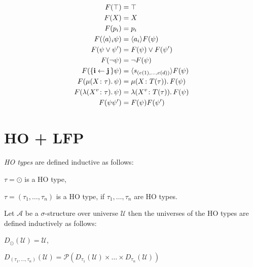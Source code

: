 \begin{frame}
\begin{definition}
\begin{align*}
F(\top) &= \top\\
F(X) &= X\\
F(p_i) &= p_i\\
F(\langle a \rangle_i \psi) &= \langle a_i \rangle F(\psi) \\
F(\psi \vee \psi') &= F(\psi) \vee F(\psi') \\
F(\neg \psi) &= \neg F(\psi) \\
F(\{\emph{i} \leftarrow \emph{j}\,\} \psi) &= \langle s_{(e(1), \dots, e(d))} \rangle F(\psi)  \\
F(\mu (X \colon \tau).\,\psi) &= \mu (X \colon T(\tau)).\,F(\psi) \\
F(\lambda (X^v \colon \tau).\, \psi) &= \lambda (X^v \colon T(\tau)).\, F(\psi) \\
F(\psi{\psi'}) &= F(\psi)F({\psi'})
\end{align*}

\end{definition}
\end{frame}

\section{HO + LFP}

\begin{frame}

\begin{definition}
\emph{HO types} are defined inductive as follows:
\begin{compactitem}
\item $\tau = \odot$ is a HO type,
\item $\tau = (\tau_1, \dots, \tau_n)$ is a HO type, if $\tau_1, \dots, \tau_n$ are
HO types.
\end{compactitem}
\end{definition}

\begin{definition}
Let $\mathcal{A}$ be a $\sigma$-structure over universe $\mathcal{U}$ then the universes of the
HO types are defined inductively as follows:
\begin{compactitem}
\item $D_\odot(\mathcal{U}) = \mathcal{U}$,
\item $D_{(\tau_1, \dots, \tau_n)}(\mathcal{U}) = \mathcal{P}(D_{\tau_1}(\mathcal{U}) \times \dots \times
D_{\tau_n}(\mathcal{U}))$
\end{compactitem}
\end{definition}

\end{frame}

